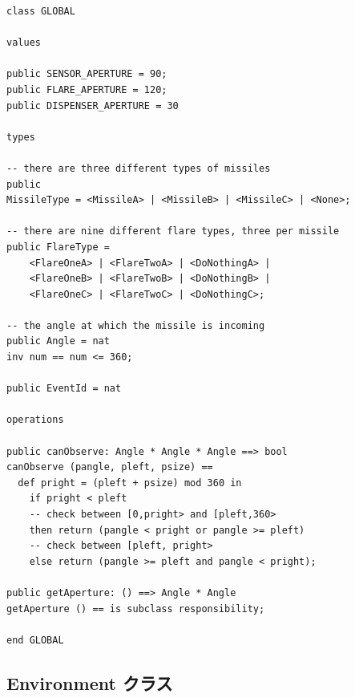 \documentclass[\pformat,12pt]{jreport}
\begin{document}
\begin{lstlisting}
class GLOBAL

values

public SENSOR_APERTURE = 90;
public FLARE_APERTURE = 120;
public DISPENSER_APERTURE = 30

types

-- there are three different types of missiles
public 
MissileType = <MissileA> | <MissileB> | <MissileC> | <None>;

-- there are nine different flare types, three per missile
public FlareType =
    <FlareOneA> | <FlareTwoA> | <DoNothingA> | 
    <FlareOneB> | <FlareTwoB> | <DoNothingB> | 
    <FlareOneC> | <FlareTwoC> | <DoNothingC>;

-- the angle at which the missile is incoming
public Angle = nat
inv num == num <= 360;

public EventId = nat

operations

public canObserve: Angle * Angle * Angle ==> bool
canObserve (pangle, pleft, psize) ==
  def pright = (pleft + psize) mod 360 in
    if pright < pleft
    -- check between [0,pright> and [pleft,360>
    then return (pangle < pright or pangle >= pleft)
    -- check between [pleft, pright>
    else return (pangle >= pleft and pangle < pright);
       
public getAperture: () ==> Angle * Angle
getAperture () == is subclass responsibility;

end GLOBAL
\end{lstlisting}

\subsection{Environment クラス}
\end{document}

